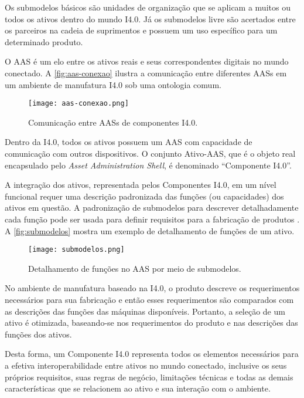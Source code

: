 Os submodelos básicos são unidades de organização que se aplicam a muitos ou todos os ativos dentro do mundo I4.0. Já os submodelos livre são acertados entre os parceiros na cadeia de suprimentos e possuem um uso específico para um determinado produto.

O AAS é um elo entre os ativos reais e seus correspondentes digitais no mundo conectado. A \autoref{fig:aas-conexao} ilustra a comunicação entre diferentes AASs em um ambiente de manufatura I4.0 sob uma ontologia comum.

\begin{figure}[htb]
	\centering
	\texttt{[image: aas-conexao.png]}
	\caption{Comunicação entre AASs de componentes I4.0.}
	\label{fig:aas-conexao}
\end{figure}

Dentro da I4.0, todos os ativos possuem um AAS com capacidade de comunicação com outros dispositivos. O conjunto Ativo-AAS, que é o objeto real encapsulado pelo \textit{Asset Administration Shell}, é denominado ``Componente I4.0''.

A integração dos ativos, representada pelos Componentes I4.0, em um nível funcional requer uma descrição padronizada das funções (ou capacidades) dos ativos em questão. A padronização de submodelos para descrever detalhadamente cada função pode ser usada para definir requisitos para a fabricação de produtos \cite{bedenbender2017aasexamples}. A \autoref{fig:submodelos} mostra um exemplo de detalhamento de funções de um ativo.

\begin{figure}[htb]
	\centering
	\texttt{[image: submodelos.png]}
	\caption{Detalhamento de funções no AAS por meio de submodelos.}
	\label{fig:submodelos}
\end{figure}

No ambiente de manufatura baseado na I4.0, o produto descreve os requerimentos necessários para sua fabricação e então esses requerimentos são comparados com as descrições das funções das máquinas disponíveis. Portanto, a seleção de um ativo é otimizada, baseando-se nos requerimentos do produto e nas descrições das funções dos ativos.

Desta forma, um Componente I4.0 representa todos os elementos necessários para a efetiva interoperabilidade entre ativos no mundo conectado, inclusive os seus próprios requisitos, suas regras de negócio, limitações técnicas e todas as demais características que se relacionem ao ativo e sua interação com o ambiente.

